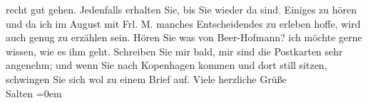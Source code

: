 \begin{ledgroupsized}[t]{13cm}
               recht gut gehen. Jedenfalls erhalten Sie, bis Sie wieder da sind\textcolor{gray}{,} Einiges zu hören und
               da ich im August mit Frl. M. manches
               Entscheidendes zu erleben hoffe, wird auch genug zu erzählen sein. Hören Sie was von
                  Beer-Hofmann? ich möchte gerne wissen, wie
               es ihm geht. Schreiben {\pb}Sie mir
               bald, mir sind die Postkarten sehr angenehm; und wenn Sie nach Kopenhagen kommen und dort still sitzen, schwingen Sie sich
               wol zu einem Brief auf. \pend
           \pstart
           Viele herzliche Grüße {\\[\baselineskip]}\spacefill\mbox{Salten}\pend
           \leftskip=0em{}
         
         \endnumbering{}\end{ledgroupsized}\begin{anhang}\end{anhang}\newcommand{\dateiname}{L03174}\newcommand{\titel}{Felix Salten an Arthur Schnitzler, 14. 7. [1896]}\newcommand{\editorInnen}{Martin Anton Müller und Laura Untner}
      